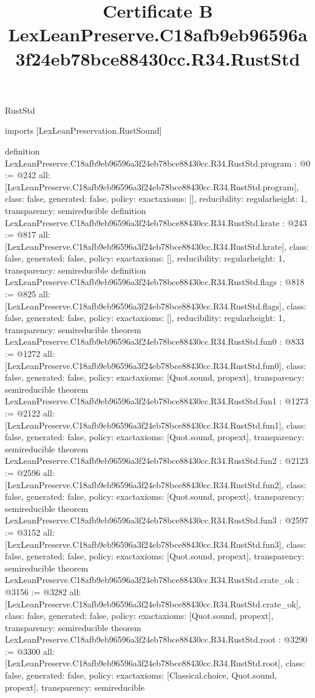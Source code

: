 \begin{lexlean}{RustStd}
\title{Certificate B LexLeanPreserve.C18afb9eb96596a3f24eb78bce88430cc.R34.RustStd}
\begin{coremodule}
imports [LexLeanPreservation.RustSound]

definition LexLeanPreserve.C18afb9eb96596a3f24eb78bce88430cc.R34.RustStd.program : @0 := @242 {
  all: [LexLeanPreserve.C18afb9eb96596a3f24eb78bce88430cc.R34.RustStd.program],
  class: false,
  generated: false,
  policy: exact{axioms: []},
  reducibility: regular{height: 1},
  transparency: semireducible
}
definition LexLeanPreserve.C18afb9eb96596a3f24eb78bce88430cc.R34.RustStd.krate : @243 := @817 {
  all: [LexLeanPreserve.C18afb9eb96596a3f24eb78bce88430cc.R34.RustStd.krate],
  class: false,
  generated: false,
  policy: exact{axioms: []},
  reducibility: regular{height: 1},
  transparency: semireducible
}
definition LexLeanPreserve.C18afb9eb96596a3f24eb78bce88430cc.R34.RustStd.flags : @818 := @825 {
  all: [LexLeanPreserve.C18afb9eb96596a3f24eb78bce88430cc.R34.RustStd.flags],
  class: false,
  generated: false,
  policy: exact{axioms: []},
  reducibility: regular{height: 1},
  transparency: semireducible
}
theorem LexLeanPreserve.C18afb9eb96596a3f24eb78bce88430cc.R34.RustStd.fun0 : @833 := @1272 {
  all: [LexLeanPreserve.C18afb9eb96596a3f24eb78bce88430cc.R34.RustStd.fun0],
  class: false,
  generated: false,
  policy: exact{axioms: [Quot.sound, propext]},
  transparency: semireducible
}
theorem LexLeanPreserve.C18afb9eb96596a3f24eb78bce88430cc.R34.RustStd.fun1 : @1273 := @2122 {
  all: [LexLeanPreserve.C18afb9eb96596a3f24eb78bce88430cc.R34.RustStd.fun1],
  class: false,
  generated: false,
  policy: exact{axioms: [Quot.sound, propext]},
  transparency: semireducible
}
theorem LexLeanPreserve.C18afb9eb96596a3f24eb78bce88430cc.R34.RustStd.fun2 : @2123 := @2596 {
  all: [LexLeanPreserve.C18afb9eb96596a3f24eb78bce88430cc.R34.RustStd.fun2],
  class: false,
  generated: false,
  policy: exact{axioms: [Quot.sound, propext]},
  transparency: semireducible
}
theorem LexLeanPreserve.C18afb9eb96596a3f24eb78bce88430cc.R34.RustStd.fun3 : @2597 := @3152 {
  all: [LexLeanPreserve.C18afb9eb96596a3f24eb78bce88430cc.R34.RustStd.fun3],
  class: false,
  generated: false,
  policy: exact{axioms: [Quot.sound, propext]},
  transparency: semireducible
}
theorem LexLeanPreserve.C18afb9eb96596a3f24eb78bce88430cc.R34.RustStd.crate_ok : @3156 := @3282 {
  all: [LexLeanPreserve.C18afb9eb96596a3f24eb78bce88430cc.R34.RustStd.crate_ok],
  class: false,
  generated: false,
  policy: exact{axioms: [Quot.sound, propext]},
  transparency: semireducible
}
theorem LexLeanPreserve.C18afb9eb96596a3f24eb78bce88430cc.R34.RustStd.root : @3290 := @3300 {
  all: [LexLeanPreserve.C18afb9eb96596a3f24eb78bce88430cc.R34.RustStd.root],
  class: false,
  generated: false,
  policy: exact{axioms: [Classical.choice, Quot.sound, propext]},
  transparency: semireducible
}


\end{coremodule}
\end{lexlean}
